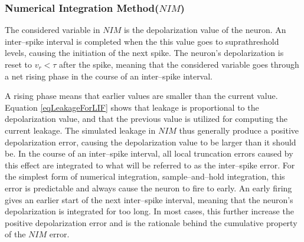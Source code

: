	\subsubsection{Numerical Integration Method($NIM$)}
		The considered variable in $NIM$ is the depolarization value of the neuron.
		An inter--spike interval is completed when the this value goes to suprathreshold levels, causing the initiation of the next spike. %
		The neuron's depolarization is reset to $v_r < \tau$ after the spike, meaning that the considered variable goes through a net rising phase in the course of an inter--spike interval. 

		A rising phase means that earlier values are smaller than the current value.
		Equation \ref{eqLeakageForLIF} shows that leakage is proportional to the depolarization value, and that the previous value is utilized for computing the current leakage.
		The simulated leakage in $NIM$ thus generally produce a positive depolarization error, causing the depolarization value to be larger than it should be.
		In the course of an inter--spike interval, all local truncation errors caused by this effect are integrated to what will be referred to as the inter--spike error.
		For the simplest form of numerical integration, sample--and--hold integration, this error is predictable and always cause the neuron to fire to early.
		An early firing gives an earlier start of the next inter--spike interval, meaning that the neuron's depolarization is integrated for too long.
		In most cases, this further increase the positive depolarization error and is the rationale behind the cumulative property of the $NIM$ error.


